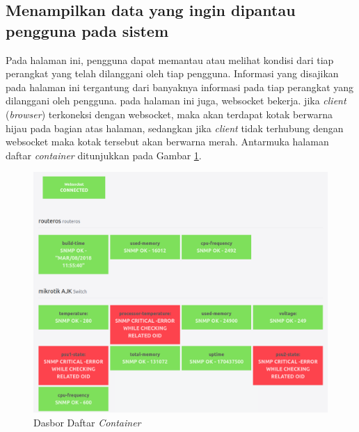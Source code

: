          \subsection{Menampilkan data yang ingin dipantau pengguna pada sistem}
         	Pada halaman ini, pengguna dapat memantau atau melihat kondisi dari tiap perangkat yang telah dilanggani oleh tiap pengguna. Informasi yang disajikan pada halaman ini tergantung dari banyaknya informasi pada tiap perangkat yang dilanggani oleh pengguna. pada halaman ini juga, websocket bekerja. jika \textit{client} (\textit{browser}) terkoneksi dengan websocket, maka akan terdapat kotak berwarna hijau pada bagian atas halaman, sedangkan jika \textit{client} tidak terhubung dengan websocket maka kotak tersebut akan berwarna merah. Antarmuka halaman daftar \textit{container} ditunjukkan pada Gambar \ref{antarmuka:pantau}.
            \begin{figure}[H]
				\centering
				\includegraphics[width=11.2cm]{Images/C-4/antarmukapantau.png}
				\caption{Dasbor Daftar \textit{Container}}
				\label{antarmuka:pantau}
			\end{figure}